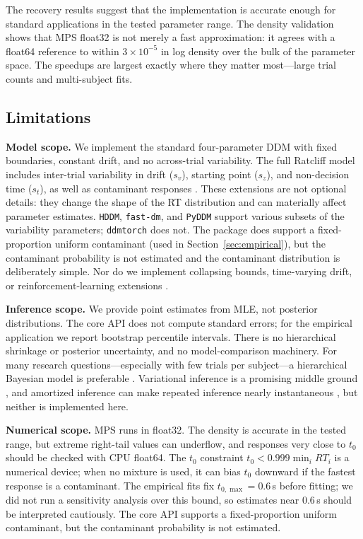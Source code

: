 \documentclass[11pt]{article}
\begin{document}
The recovery results suggest that the implementation is accurate enough for standard applications in the tested parameter range. The density validation shows that MPS float32 is not merely a fast approximation: it agrees with a float64 reference to within $3\times10^{-5}$ in log density over the bulk of the parameter space. The speedups are largest exactly where they matter most---large trial counts and multi-subject fits.

\subsection{Limitations}

\textbf{Model scope.} We implement the standard four-parameter DDM with fixed boundaries, constant drift, and no across-trial variability. The full Ratcliff model includes inter-trial variability in drift ($s_v$), starting point ($s_z$), and non-decision time ($s_t$), as well as contaminant responses \citep{RatcliffMcKoon2008}. These extensions are not optional details: they change the shape of the RT distribution and can materially affect parameter estimates. \texttt{HDDM}, \texttt{fast-dm}, and \texttt{PyDDM} support various subsets of the variability parameters; \texttt{ddmtorch} does not.  The package does support a fixed-proportion uniform contaminant (used in Section~\ref{sec:empirical}), but the contaminant probability is not estimated and the contaminant distribution is deliberately simple.  Nor do we implement collapsing bounds, time-varying drift, or reinforcement-learning extensions \citep{Fengler2022}.

\textbf{Inference scope.} We provide point estimates from MLE, not posterior distributions.  The core API does not compute standard errors; for the empirical application we report bootstrap percentile intervals.  There is no hierarchical shrinkage or posterior uncertainty, and no model-comparison machinery. For many research questions---especially with few trials per subject---a hierarchical Bayesian model is preferable \citep{Wiecki2013,Vandekerckhove2011}. Variational inference is a promising middle ground \citep{Blei2017,Kucukelbir2017}, and amortized inference can make repeated inference nearly instantaneous \citep{Wu2026}, but neither is implemented here.

\textbf{Numerical scope.} MPS runs in float32. The density is accurate in the tested range, but extreme right-tail values can underflow, and responses very close to $t_0$ should be checked with CPU float64. The $t_0$ constraint $t_0<0.999\min_i RT_i$ is a numerical device; when no mixture is used, it can bias $t_0$ downward if the fastest response is a contaminant.  The empirical fits fix $t_{0,\max}=0.6$\,s before fitting; we did not run a sensitivity analysis over this bound, so estimates near 0.6\,s should be interpreted cautiously.  The core API supports a fixed-proportion uniform contaminant, but the contaminant probability is not estimated.
\end{document}
